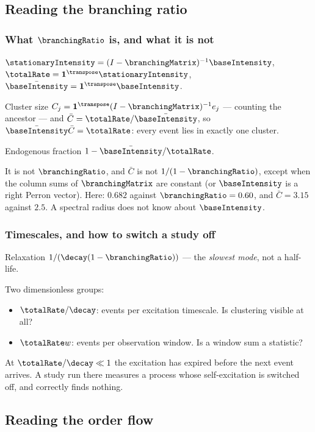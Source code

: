 \subsection{Reading the branching ratio}

\begin{frame}
  \frametitle{What $\branchingRatio$ is, and what it is not}
$\stationaryIntensity = (I-\branchingMatrix)^{-1}\baseIntensity$,
$\totalRate = \mathbf{1}^{\transpose}\stationaryIntensity$,
$\bar{\baseIntensity} = \mathbf{1}^{\transpose}\baseIntensity$.

\pause

Cluster size $C_j = \mathbf{1}^{\transpose}(I-\branchingMatrix)^{-1}e_j$
--- \alert{counting the ancestor} --- and
$\bar{C} = \totalRate/\bar{\baseIntensity}$, so $\bar{\baseIntensity}\bar{C} = \totalRate$:
every event lies in exactly one cluster.

\pause

Endogenous fraction $1 - \bar{\baseIntensity}/\totalRate$.

\pause

\alert{It is not $\branchingRatio$}, and $\bar C$ is not $1/(1-\branchingRatio)$,
except when the column sums of $\branchingMatrix$ are constant
(or $\baseIntensity$ is a right Perron vector).
Here: $0.682$ against $\branchingRatio = 0.60$, and $\bar C = 3.15$ against $2.5$.
A spectral radius does not know about $\baseIntensity$.
\end{frame}

\begin{frame}
  \frametitle{Timescales, and how to switch a study off}
Relaxation $1/(\decay(1-\branchingRatio))$ --- the \emph{slowest mode}, not a half-life.

\pause

Two dimensionless groups:
\begin{itemize}
 \item $\totalRate/\decay$: events per excitation timescale. Is clustering visible at all?
 \item $\totalRate w$: events per observation window. Is a window sum a statistic?
\end{itemize}

\pause

At $\totalRate/\decay \ll 1$ the excitation has expired before the next event arrives.
A study run there measures a process whose self-excitation is switched off,
and correctly finds nothing.
\end{frame}

\subsection{Reading the order flow}

